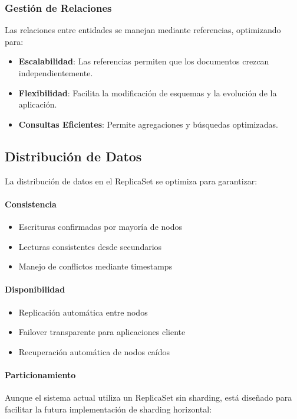 \documentclass[12pt,letterpaper]{article}
\begin{document}
\subsubsection{Gestión de Relaciones}
Las relaciones entre entidades se manejan mediante referencias, optimizando para:

\begin{itemize}
    \item \textbf{Escalabilidad}: Las referencias permiten que los documentos crezcan independientemente.
    \item \textbf{Flexibilidad}: Facilita la modificación de esquemas y la evolución de la aplicación.
    \item \textbf{Consultas Eficientes}: Permite agregaciones y búsquedas optimizadas.
\end{itemize}

\subsection{Distribución de Datos}
La distribución de datos en el ReplicaSet se optimiza para garantizar:

\paragraph{Consistencia}
\begin{itemize}
    \item Escrituras confirmadas por mayoría de nodos
    \item Lecturas consistentes desde secundarios
    \item Manejo de conflictos mediante timestamps
\end{itemize}

\paragraph{Disponibilidad}
\begin{itemize}
    \item Replicación automática entre nodos
    \item Failover transparente para aplicaciones cliente
    \item Recuperación automática de nodos caídos
\end{itemize}

\paragraph{Particionamiento}
Aunque el sistema actual utiliza un ReplicaSet sin sharding, está diseñado para facilitar la futura implementación de sharding horizontal:
\end{document}
